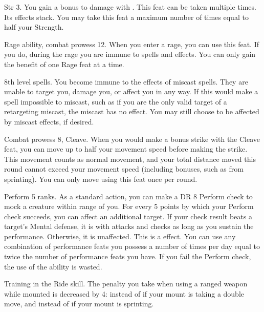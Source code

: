 \featpres Str 3.
\featben You gain a  bonus to damage with .
 This feat can be taken multiple times. Its effects stack.
You may take this feat a maximum number of times equal to half your Strength.

\featpres Rage ability, combat prowess 12.
\featben When you enter a rage, you can use this feat. If you do, during the rage you are immune to  spells and effects.
 You can only gain the benefit of one Rage feat at a time.

\featpre 8th level spells.
\featben You become immune to the effects of miscast spells.
They are unable to target you, damage you, or affect you in any way.
If this would make a spell impossible to miscast, such as if you are the only valid target of a retargeting miscast, the miscast has no effect.
You may still choose to be affected by miscast effects, if desired.

\featpres Combat prowess 8, Cleave.
\featben When you would make a bonus strike with the Cleave feat, you can move up to half your movement speed before making the strike.
This movement counts as normal movement, and your total distance moved this round cannot exceed your movement speed (including bonuses, such as from sprinting).
You can only move using this feat once per round.

\featpre Perform 5 ranks.
\featben As a standard action, you can make a DR 8 Perform check to mock a creature within \rngmed range of you.
For every 5 points by which your Perform check succeeds, you can affect an additional target.
If your check result beats a target's Mental defense, it is \impaired with attacks and checks as long as you sustain the performance.
Otherwise, it is unaffected.
This is a  effect.
You can use any combination of performance feats you possess a number of times per day equal to twice the number of performance feats you have.
If you fail the Perform check, the use of the ability is wasted.

\featpre Training in the Ride skill.
\featben The penalty you take when using a ranged weapon while mounted is decreased by 4:  instead of  if your mount is taking a double move, and  instead of  if your mount is sprinting.

